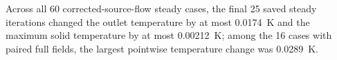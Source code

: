 Across all 60 corrected-source-flow steady cases, the final 25 saved steady iterations changed the outlet temperature by at most \SI{0.0174}{K} and the maximum solid temperature by at most \SI{0.00212}{K}; among the 16 cases with paired full fields, the largest pointwise temperature change was \SI{0.0289}{K}.
